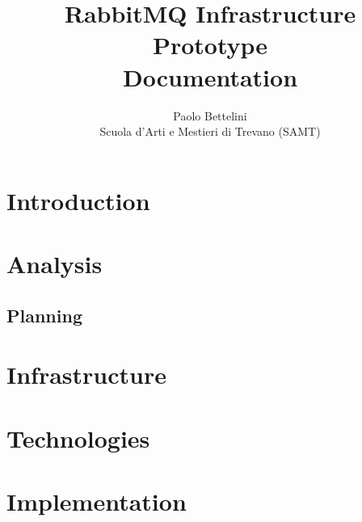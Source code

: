 \documentclass[a4paper]{article}
\title{%
    RabbitMQ Infrastructure Prototype \\
    \large Documentation
}
\author{%
    Paolo Bettelini \\
    \large Scuola d'Arti e Mestieri di Trevano (SAMT)}
\date{}
\begin{document}
\maketitle

\pagebreak

\tableofcontents

\pagebreak

\section{Introduction}



\pagebreak

\section{Analysis}



\pagebreak

\begin{landscape}
    
    \section{Planning}
    
    

\end{landscape}

\pagebreak

\section{Infrastructure}



\pagebreak

\section{Technologies}



\pagebreak

\section{Implementation}


\end{document}
